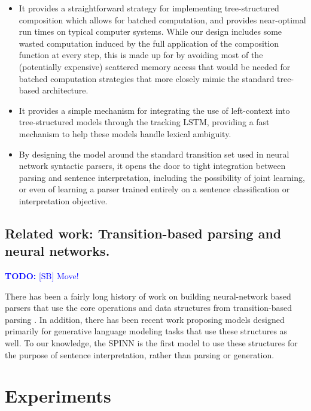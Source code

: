 \documentclass[11pt]{article}
\newcommand\todo[1]{\textcolor{blue}{\textbf{TODO:} #1}}
\begin{document}
\begin{itemize}
\item It provides a straightforward strategy for implementing tree-structured composition which allows for batched computation, and provides near-optimal run times on typical computer systems. While our design includes some wasted computation induced by the full application of the composition function at every step, this is made up for by avoiding most of the (potentially expensive) scattered memory access that would be needed for batched computation strategies that more closely mimic the standard tree-based architecture.

\item It provides a simple mechanism for integrating the use of left-context into tree-structured models through the tracking LSTM, providing a fast mechanism to help these models handle lexical ambiguity.

\item By designing the model around the standard transition set used in neural network syntactic parsers, it opens the door to tight integration between parsing and sentence interpretation, including the possibility of joint learning, or even of learning a parser trained entirely on a sentence classification or interpretation objective.
\end{itemize}

\subsection{Related work: Transition-based parsing and neural networks.}
\todo{[SB] Move!}

There has been a fairly long history of work on building neural-network based parsers that use the core operations and data structures from transition-based parsing \citep{henderson2004discriminative,emami2005neural,titov2010latent,buys2generative,chen2014,dyer-EtAl:2015:ACL-IJCNLP,kiperwasser2016easy}. In addition, there has been recent work \citep{zhang2016top,dyer2016rnn} proposing models designed primarily for generative language modeling tasks that use these structures as well. To our knowledge, the SPINN is the first model to use these structures for the purpose of sentence interpretation, rather than parsing or generation.

\section{Experiments}
\end{document}
